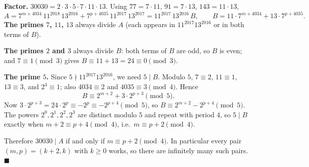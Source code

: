 \textbf{Factor.} $30030=2\cdot3\cdot5\cdot7\cdot11\cdot13$. Using $77=7\cdot11$, $91=7\cdot13$, $143=11\cdot13$,
\[
A=7^{m+4034}\,11^{2018}\,13^{2016}+7^{p+4035}\,11^{2017}\,13^{2017}=11^{2017}\,13^{2016}\,B,\qquad B=11\cdot7^{m+4034}+13\cdot7^{p+4035}.
\]
\textbf{The primes $7$, $11$, $13$} always divide $A$ (each appears in $11^{2017}13^{2016}$ or in both terms of $B$).

\textbf{The primes $2$ and $3$} always divide $B$: both terms of $B$ are odd, so $B$ is even; and $7\equiv1\pmod3$ gives $B\equiv11+13=24\equiv0\pmod3$.

\textbf{The prime $5$.} Since $5\nmid11^{2017}13^{2016}$, we need $5\mid B$. Modulo $5$, $7\equiv2$, $11\equiv1$, $13\equiv3$, and $2^4\equiv1$; also $4034\equiv2$ and $4035\equiv3\pmod4$. Hence
\[
B\equiv2^{m+2}+3\cdot2^{p+3}\pmod5 .
\]
Now $3\cdot2^{p+3}=24\cdot2^p\equiv-2^p\equiv-2^{p+4}\pmod5$, so $B\equiv2^{m+2}-2^{p+4}\pmod5$. The powers $2^0,2^1,2^2,2^3$ are distinct modulo $5$ and repeat with period $4$, so $5\mid B$ exactly when $m+2\equiv p+4\pmod4$, i.e.\ $m\equiv p+2\pmod4$.

Therefore $30030\mid A$ if and only if $m\equiv p+2\pmod 4$. In particular every pair $(m,p)=(k+2,k)$ with $k\ge0$ works, so there are infinitely many such pairs. $\blacksquare$
